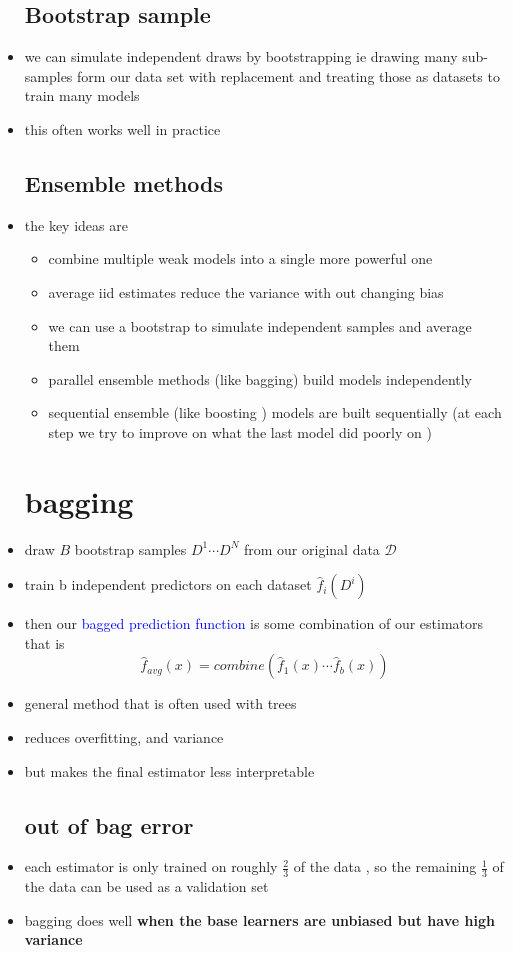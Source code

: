 \documentclass{article}
\begin{document}
\begin{itemize}
\subsection*{Bootstrap sample}
\item we can simulate independent draws by bootstrapping ie drawing many sub-samples form our  data set with replacement and treating those as datasets to train many models 
\item this often works well in practice
\subsection*{Ensemble methods}
\item the key ideas are 
\begin{itemize}
    \item combine multiple weak models into a single more powerful one 
    \item average iid estimates reduce the variance with out changing  bias 
    \item we can use a bootstrap to simulate independent samples and average them 
    \item parallel ensemble methods (like bagging) build models independently 
    \item sequential ensemble (like boosting ) models are built sequentially (at each step we try to improve on what the last model did poorly on )
    

\end{itemize}
\section*{bagging }
\item draw $B$ bootstrap samples $D^{1}\cdots D^{N}$ from our original data $\mathcal{D}$
\item train b independent predictors on each dataset $\hat{f}_{i}(D^{i})$ 
\item then our \textcolor{blue}{bagged prediction function} is some combination of our estimators that is $$\hat{f}_{avg}(x)=combine(\hat{f}_1(x)\cdots \hat{f}_b(x))$$
\item general method that is often used with trees 
\item reduces overfitting, and variance 
\item but makes the final estimator less interpretable
\subsection*{out of bag error}
\item each estimator is only trained on roughly $\frac{2}{3}$ of the data , so the remaining $\frac{1}{3}$ of the data can be used as a validation set 
\item bagging does well \textbf{when the base learners are unbiased but have high variance}

\end{itemize}
\end{document}
